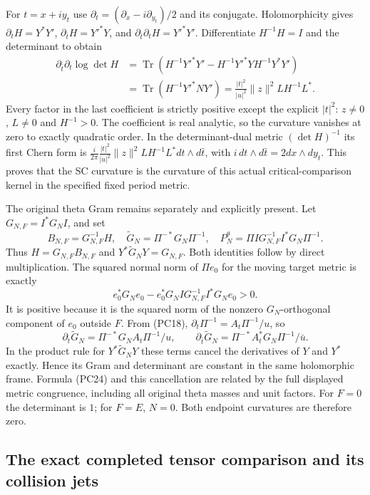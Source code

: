 \documentclass{article}
\begin{document}
For $t=x+iy_t$ use
$\partial_t=(\partial_x-i\partial_{y_t})/2$ and its conjugate.
Holomorphicity gives $\partial_tH=Y^*Y'$,
$\partial_{\bar t}H=Y'^*Y$, and
$\partial_{\bar t}\partial_tH=Y'^*Y'$.
Differentiate $H^{-1}H=I$ and the determinant to obtain
\[
\begin{split}
 \partial_{\bar t}\partial_t\log\det H
 &=\operatorname{Tr}(H^{-1}Y'^*Y'
     -H^{-1}Y'^*YH^{-1}Y^*Y')\\
 &=\operatorname{Tr}(H^{-1}Y'^*NY')
   =\frac{|t|^2}{|u|^2}\|z\|^2 L H^{-1}L^*.
\end{split}\tag{PC24}
\]
Every factor in the last coefficient is strictly positive except the
explicit $|t|^2$: $z\ne0$, $L\ne0$ and $H^{-1}>0$.
The coefficient is real analytic, so the curvature vanishes at zero
to exactly quadratic order.  In the determinant-dual metric
$(\det H)^{-1}$ its first Chern form is
$\frac{i}{2\pi}\frac{|t|^2}{|u|^2}\|z\|^2LH^{-1}L^*
dt\wedge d\bar t$, with $i\,dt\wedge d\bar t=2dx\wedge dy_t$.
This proves that the SC curvature is the curvature of this actual
critical-comparison kernel in the specified fixed period metric.

The original theta Gram remains separately and explicitly present.
Let $G_{N,F}=I^*G_NI$, and set
\[
 B_{N,F}=G_{N,F}^{-1}H,\quad
 \widetilde G_N=\Pi^{-*}G_N\Pi^{-1},\quad
 P_N^\theta=\Pi I G_{N,F}^{-1}I^*G_N\Pi^{-1}.
 \tag{PC25}
\]
Thus $H=G_{N,F}B_{N,F}$ and
$Y^*\widetilde G_NY=G_{N,F}$.  Both identities follow by direct
multiplication.  The squared normal norm of $\Pi e_0$ for the
moving target metric is exactly
\[
 e_0^*G_Ne_0-e_0^*G_NI G_{N,F}^{-1}I^*G_Ne_0>0.
 \tag{PC26}
\]
It is positive because it is the squared norm of the nonzero
$G_N$-orthogonal component of $e_0$ outside $F$.  From (PC18),
$\partial_t\Pi^{-1}=A_t\Pi^{-1}/u$, so
\[
 \partial_t\widetilde G_N=\Pi^{-*}G_NA_t\Pi^{-1}/u,
 \qquad
 \partial_{\bar t}\widetilde G_N=
       \Pi^{-*}A_t^*G_N\Pi^{-1}/\bar u.
 \tag{PC27}
\]
In the product rule for $Y^*\widetilde G_NY$ these terms cancel
the derivatives of $Y$ and $Y^*$ exactly.  Hence its Gram and
determinant are constant in the same holomorphic frame.  Formula
(PC24) and this cancellation are related by the full displayed
metric congruence, including all original theta masses and unit factors.
For $F=0$ the determinant is $1$; for $F=E$, $N=0$.
Both endpoint curvatures are therefore zero.

\subsection{The exact completed tensor comparison and its collision jets}
\end{document}
